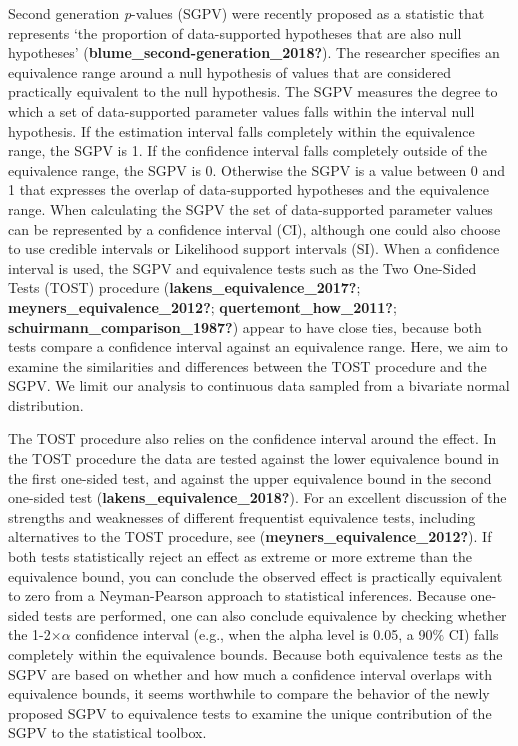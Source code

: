 \documentclass[
  english,
  man]{apa6}
\begin{document}
Second generation \emph{p}-values (SGPV) were recently proposed as a statistic that represents `the proportion of data-supported hypotheses that are also null hypotheses' (\textbf{blume\_second-generation\_2018?}).
The researcher specifies an equivalence range around a null hypothesis of values that are considered practically equivalent to the null hypothesis.
The SGPV measures the degree to which a set of data-supported parameter values falls within the interval null hypothesis.
If the estimation interval falls completely within the equivalence range, the SGPV is 1.
If the confidence interval falls completely outside of the equivalence range, the SGPV is 0. Otherwise the SGPV is a value between 0 and 1 that expresses the overlap of data-supported hypotheses and the equivalence range.
When calculating the SGPV the set of data-supported parameter values can be represented by a confidence interval (CI), although one could also choose to use credible intervals or Likelihood support intervals (SI).
When a confidence interval is used, the SGPV and equivalence tests such as the Two One-Sided Tests (TOST) procedure (\textbf{lakens\_equivalence\_2017?}; \textbf{meyners\_equivalence\_2012?}; \textbf{quertemont\_how\_2011?}; \textbf{schuirmann\_comparison\_1987?}) appear to have close ties, because both tests compare a confidence interval against an equivalence range.
Here, we aim to examine the similarities and differences between the TOST procedure and the SGPV.
We limit our analysis to continuous data sampled from a bivariate normal distribution.

The TOST procedure also relies on the confidence interval around the effect.
In the TOST procedure the data are tested against the lower equivalence bound in the first one-sided test, and against the upper equivalence bound in the second one-sided test (\textbf{lakens\_equivalence\_2018?}). For an excellent discussion of the strengths and weaknesses of different frequentist equivalence tests, including alternatives to the TOST procedure, see (\textbf{meyners\_equivalence\_2012?}).
If both tests statistically reject an effect as extreme or more extreme than the equivalence bound, you can conclude the observed effect is practically equivalent to zero from a Neyman-Pearson approach to statistical inferences.
Because one-sided tests are performed, one can also conclude equivalence by checking whether the 1-2\(\times\)\(\alpha\) confidence interval (e.g., when the alpha level is 0.05, a 90\(\%\) CI) falls completely within the equivalence bounds. Because both equivalence tests as the SGPV are based on whether and how much a confidence interval overlaps with equivalence bounds, it seems worthwhile to compare the behavior of the newly proposed SGPV to equivalence tests to examine the unique contribution of the SGPV to the statistical toolbox.
\end{document}
